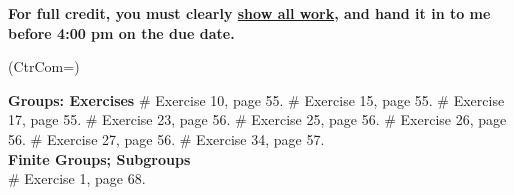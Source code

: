 \documentclass[11pt]{book}
\begin{document}
\thispagestyle{fancy}
\noindent	\textbf{For full credit, you must clearly \underline{show all work}, and hand it  in to me before 4:00 pm on the due date.}\hfill
\vspace{0.3in}

\begin{easylist}
\ListProperties(CtrCom=\fbox)

\noindent \textbf{Groups: Exercises}
\vspace{0.2in}
# Exercise 10, page 55.
\vspace{0.2in}
# Exercise 15, page 55.
\vspace{0.2in}
# Exercise 17, page 55.
\vspace{0.2in}
# Exercise 23, page 56.
\vspace{0.2in}
# Exercise 25, page 56.
\vspace{0.2in}
# Exercise 26, page 56. 
\vspace{0.2in}
# Exercise 27, page 56.
\vspace{0.2in}
# Exercise 34, page 57.\\

\vspace{0.5in}
\noindent \textbf{Finite Groups; Subgroups}\\
\vspace{0.2in}
# Exercise 1, page 68.
 \end{easylist}
\end{document}

